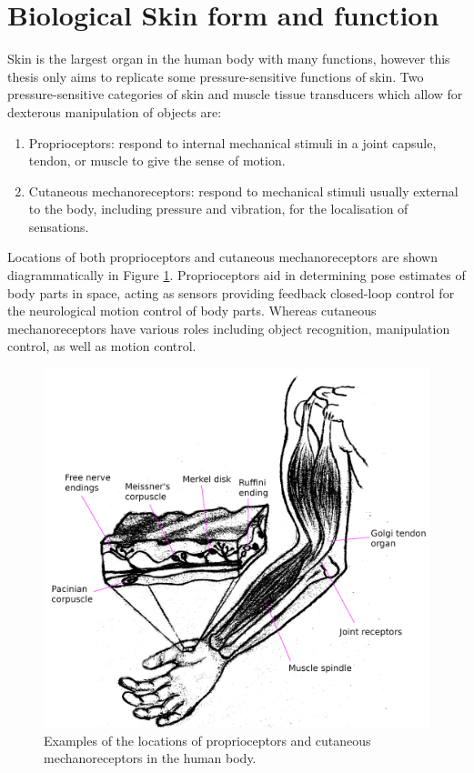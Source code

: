 \section{Biological Skin form and function}
Skin is the largest organ in the human body with many functions, however this thesis only aims to replicate some pressure-sensitive functions of skin. Two pressure-sensitive categories of skin and muscle tissue transducers which allow for dexterous manipulation of objects are:
\begin{enumerate} 
    \item Proprioceptors: respond to internal mechanical stimuli in a joint capsule, tendon, or muscle to give the sense of motion.
    \item Cutaneous mechanoreceptors:  respond to mechanical stimuli usually external to the body, including pressure and vibration, for the localisation of sensations. 
\end{enumerate} 
Locations of both proprioceptors and cutaneous mechanoreceptors are shown diagrammatically in Figure \ref{fig:proprioceptors-mechanoreceptors}. Proprioceptors aid in determining pose estimates of body parts in space, acting as sensors providing feedback closed-loop control for the neurological motion control of body parts. Whereas cutaneous mechanoreceptors have various roles including object recognition, manipulation control, as well as motion control.
\begin{figure}[H]
    \centering
    \includegraphics[width=0.6\linewidth]{Figures/propriocetors_n_cutaneous_mechanoreceptors_labelled.png}
    \caption{Examples of the locations of proprioceptors and cutaneous mechanoreceptors in the human body.}
    \label{fig:proprioceptors-mechanoreceptors}
\end{figure}

